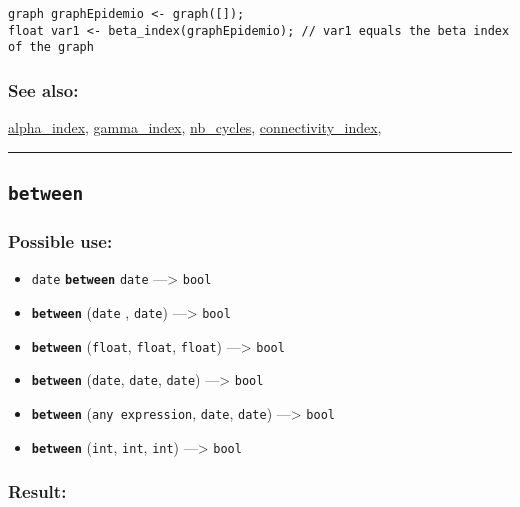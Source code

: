 \documentclass[]{book}
\providecommand{\tightlist}{%
  \setlength{\itemsep}{0pt}\setlength{\parskip}{0pt}}
\theoremstyle{definition}
\theoremstyle{definition}
\theoremstyle{definition}
\theoremstyle{remark}
\begin{document}
\begin{verbatim}
graph graphEpidemio <- graph([]);  
float var1 <- beta_index(graphEpidemio); // var1 equals the beta index of the graph
\end{verbatim}

\subsubsection{See also:}\label{see-also-43}

\href{OperatorsAA\#alpha_index}{alpha\_index},
\href{OperatorsDH\#gamma_index}{gamma\_index},
\href{OperatorsNR\#nb_cycles}{nb\_cycles},
\href{OperatorsBC\#connectivity_index}{connectivity\_index},

\begin{center}\rule{0.5\linewidth}{\linethickness}\end{center}

\subsection{\texorpdfstring{\texttt{between}}{between}}\label{between}

\subsubsection{Possible use:}\label{possible-use-67}

\begin{itemize}
\tightlist
\item
  \texttt{date} \textbf{\texttt{between}} \texttt{date}
  ---\textgreater{} \texttt{bool}
\item
  \textbf{\texttt{between}} (\texttt{date} , \texttt{date})
  ---\textgreater{} \texttt{bool}
\item
  \textbf{\texttt{between}} (\texttt{float}, \texttt{float},
  \texttt{float}) ---\textgreater{} \texttt{bool}
\item
  \textbf{\texttt{between}} (\texttt{date}, \texttt{date},
  \texttt{date}) ---\textgreater{} \texttt{bool}
\item
  \textbf{\texttt{between}} (\texttt{any\ expression}, \texttt{date},
  \texttt{date}) ---\textgreater{} \texttt{bool}
\item
  \textbf{\texttt{between}} (\texttt{int}, \texttt{int}, \texttt{int})
  ---\textgreater{} \texttt{bool}
\end{itemize}

\subsubsection{Result:}\label{result-66}
\end{document}
